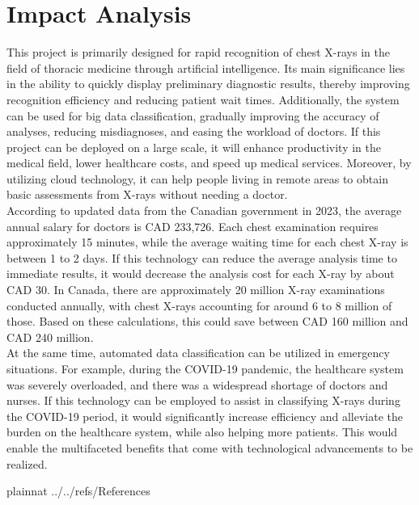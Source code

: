 \documentclass[12pt]{article}
\begin{document}
\section{Impact Analysis}
This project is primarily designed for rapid recognition of chest X-rays in the field of thoracic medicine through artificial intelligence. Its main significance lies in the ability to quickly display preliminary diagnostic results, thereby improving recognition efficiency and reducing patient wait times. Additionally, the system can be used for big data classification, gradually improving the accuracy of analyses, reducing misdiagnoses, and easing the workload of doctors. If this project can be deployed on a large scale, it will enhance productivity in the medical field, lower healthcare costs, and speed up medical services. Moreover, by utilizing cloud technology, it can help people living in remote areas to obtain basic assessments from X-rays without needing a doctor. \\

According to updated data from the Canadian government in 2023, the average annual salary for doctors is CAD 233,726. Each chest examination requires approximately 15 minutes, while the average waiting time for each chest X-ray is between 1 to 2 days. If this technology can reduce the average analysis time to immediate results, it would decrease the analysis cost for each X-ray by about CAD 30. In Canada, there are approximately 20 million X-ray examinations conducted annually, with chest X-rays accounting for around 6 to 8 million of those. Based on these calculations, this could save between CAD 160 million and CAD 240 million. \\

At the same time, automated data classification can be utilized in emergency situations. For example, during the COVID-19 pandemic, the healthcare system was severely overloaded, and there was a widespread shortage of doctors and nurses. If this technology can be employed to assist in classifying X-rays during the COVID-19 period, it would significantly increase efficiency and alleviate the burden on the healthcare system, while also helping more patients. This would enable the multifaceted benefits that come with technological advancements to be realized. \\

\newpage

 {plainnat}
 {../../refs/References}

\newpage
\end{document}
